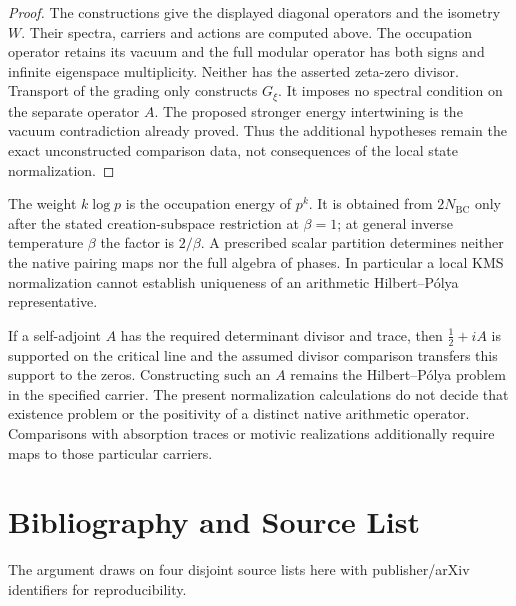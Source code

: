 \begin{proof}
The constructions give the displayed diagonal operators and the
isometry $W$. Their spectra, carriers and actions are computed
above. The occupation operator retains its vacuum and the full
modular operator has both signs and infinite eigenspace
multiplicity. Neither has the asserted zeta-zero divisor.
Transport of the grading only constructs $G_\xi$. It imposes
no spectral condition on the separate operator $A$. The proposed
stronger energy intertwining is the vacuum contradiction already
proved. Thus the additional hypotheses remain the exact
unconstructed comparison data, not consequences of the local
state normalization.
\end{proof}

\begin{remark}
\label{v4-arith:w5-b:rem:W-honest}
The weight $k\log p$ is the occupation energy of $p^k$.
It is obtained from $2N_{\mathrm{BC}}$ only after the stated
creation-subspace restriction at $\beta=1$; at general inverse
temperature $\beta$ the factor is $2/\beta$.
A prescribed scalar partition determines neither the native
pairing maps nor the full algebra of phases. In particular a
local KMS normalization cannot establish uniqueness of an
arithmetic Hilbert--P\'olya representative.
\end{remark}

\begin{remark}
\label{v4-arith:w5-b:rem:honest-conditional}
If a self-adjoint $A$ has the required determinant divisor and
trace, then $\tfrac12+iA$ is supported on the critical line and
the assumed divisor comparison transfers this support to the
zeros. Constructing such an $A$ remains the Hilbert--P\'olya
problem in the specified carrier. The present normalization
calculations do not decide that existence problem or the
positivity of a distinct native arithmetic operator. Comparisons
with absorption traces or motivic realizations additionally
require maps to those particular carriers.
\end{remark}

\section{Bibliography and Source List}
\label{v4-arith:w5-b:biblio}

The argument draws on four disjoint source lists
here with publisher/arXiv identifiers for reproducibility.

